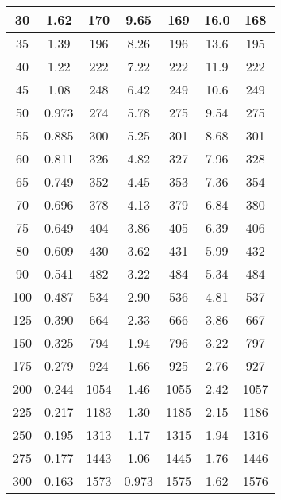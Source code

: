 \begin{table}[htbp]
\begin{tabular}{|c|c|c|c|c|c|c|}
30 & 1.62 & 170 & 9.65 & 169 & 16.0 & 168 \\ \hline
35 & 1.39 & 196 & 8.26 & 196 & 13.6 & 195 \\ \hline
40 & 1.22 & 222 & 7.22 & 222 & 11.9 & 222 \\ \hline
45 & 1.08 & 248 & 6.42 & 249 & 10.6 & 249 \\ \hline
50 & 0.973 & 274 & 5.78 & 275 & 9.54 & 275 \\ \hline
55 & 0.885 & 300 & 5.25 & 301 & 8.68 & 301 \\ \hline
60 & 0.811 & 326 & 4.82 & 327 & 7.96 & 328 \\ \hline
65 & 0.749 & 352 & 4.45 & 353 & 7.36 & 354 \\ \hline
70 & 0.696 & 378 & 4.13 & 379 & 6.84 & 380 \\ \hline
75 & 0.649 & 404 & 3.86 & 405 & 6.39 & 406 \\ \hline
80 & 0.609 & 430 & 3.62 & 431 & 5.99 & 432 \\ \hline
90 & 0.541 & 482 & 3.22 & 484 & 5.34 & 484 \\ \hline
100 & 0.487 & 534 & 2.90 & 536 & 4.81 & 537 \\ \hline
125 & 0.390 & 664 & 2.33 & 666 & 3.86 & 667 \\ \hline
150 & 0.325 & 794 & 1.94 & 796 & 3.22 & 797 \\ \hline
175 & 0.279 & 924 & 1.66 & 925 & 2.76 & 927 \\ \hline
200 & 0.244 & 1054 & 1.46 & 1055 & 2.42 & 1057 \\ \hline
225 & 0.217 & 1183 & 1.30 & 1185 & 2.15 & 1186 \\ \hline
250 & 0.195 & 1313 & 1.17 & 1315 & 1.94 & 1316 \\ \hline
275 & 0.177 & 1443 & 1.06 & 1445 & 1.76 & 1446 \\ \hline
300 & 0.163 & 1573 & 0.973 & 1575 & 1.62 & 1576 \\ \hline
\end{tabular}
\end{table}

